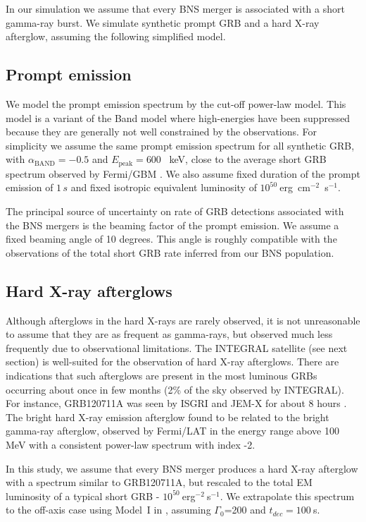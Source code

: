 \documentclass[11pt]{article}
\begin{document}
In our simulation we assume that every BNS merger is associated with a short
gamma-ray burst. We simulate synthetic prompt GRB and a hard X-ray afterglow,
assuming the following simplified model.

\subsection*{Prompt emission}

We model the prompt emission spectrum by the cut-off power-law model. This model
is a variant of the Band model \citep{1993ApJ...413..281B} where high-energies
have been suppressed because they are generally not well constrained by the
observations. For simplicity we assume the same prompt emission spectrum for all
synthetic GRB, with $\alpha_{\mathrm{BAND}} = - 0.5$ and $E_{\mathrm{peak}} =
600$ \, keV, close to the average short GRB spectrum observed by Fermi/GBM
\citep{2014ApJS..211...12G}. We also assume fixed duration of the prompt
emission of $1 \, s$ and fixed isotropic equivalent luminosity of
$10^{50}~$erg~cm$^{-2}$~s$^{-1}$.

The principal source of uncertainty on rate of GRB detections associated with
the BNS mergers is the beaming factor of the prompt emission. We assume a fixed
beaming angle of 10 degrees. This angle is roughly compatible with the observations
of the total short GRB rate inferred from our BNS population.

\subsection*{Hard X-ray afterglows}

Although afterglows in the hard X-rays are rarely observed, it is not
unreasonable to assume that they are as frequent as gamma-rays, but observed
much less frequently due to observational limitations. The INTEGRAL satellite
(see next section) is well-suited for the observation of hard X-ray
afterglows. There are indications that such afterglows are present in the most
luminous GRBs occurring about once in few months (2\% of the sky observed by
INTEGRAL). For instance, GRB120711A was seen by ISGRI and JEM-X for about 8
hours \citep{2014A&A...567A..84M}. The bright hard X-ray emission afterglow
found to be related to the bright gamma-ray afterglow, observed by Fermi/LAT in
the energy range above 100 MeV with a consistent power-law spectrum with index
-2.

In this study, we assume that every BNS merger produces a hard X-ray
afterglow with a spectrum similar to GRB120711A, but rescaled to the
total EM luminosity of a typical short GRB -
$10^{50}~$erg$^{-2}~$s$^{-1}$. We extrapolate this spectrum to the
off-axis case using Model~I in \citep{2016arXiv160606124P}, assuming
$\Gamma_0$=200 and $t_{dec}=100~$s.
\end{document}
